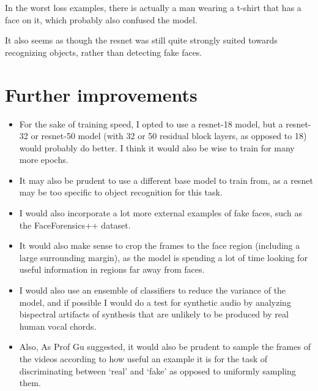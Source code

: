 \documentclass[12pt,letterpaper]{hmcpset}
\begin{document}
In the worst loss examples, there is actually a man wearing a t-shirt that has a face on it, which probably also confused the model.

It also seems as though the resnet was still quite strongly suited towards recognizing objects, rather than detecting fake faces.

\section{Further improvements}
\begin{itemize}
    \item For the sake of training speed, I opted to use a resnet-18 model, but a resnet-32 or resnet-50 model (with 32 or 50 residual block layers, as opposed to 18) would probably do better. 
I think it would also be wise to train for many more epochs.

    \item It may also be prudent to use a different base model to train from, as a resnet may be too specific to object recognition for this task.

    \item I would also incorporate a lot more external examples of fake faces, such as the FaceForensics++ dataset.

    \item It would also make sense to crop the frames to the face region (including a large surrounding margin), as the model is spending a lot of time looking for useful information in regions far away from faces.

    \item I would also use an ensemble of classifiers to reduce the variance of the model, and if possible I would do a test for synthetic audio by analyzing bispectral artifacts of synthesis that are unlikely to be produced by real human vocal chords.

    \item Also, As Prof Gu suggested, it would also be prudent to sample the frames of the videos according to how useful an example it is for the task of discriminating between `real' and `fake' as opposed to uniformly sampling them.

\end{itemize}


\end{document}
